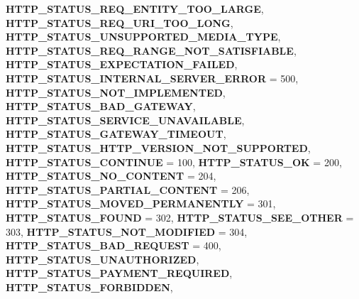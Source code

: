 \begin{DoxyCompactItemize}
{\bfseries H\+T\+T\+P\+\_\+\+S\+T\+A\+T\+U\+S\+\_\+\+R\+E\+Q\+\_\+\+E\+N\+T\+I\+T\+Y\+\_\+\+T\+O\+O\+\_\+\+L\+A\+R\+GE}, 
\newline
{\bfseries H\+T\+T\+P\+\_\+\+S\+T\+A\+T\+U\+S\+\_\+\+R\+E\+Q\+\_\+\+U\+R\+I\+\_\+\+T\+O\+O\+\_\+\+L\+O\+NG}, 
{\bfseries H\+T\+T\+P\+\_\+\+S\+T\+A\+T\+U\+S\+\_\+\+U\+N\+S\+U\+P\+P\+O\+R\+T\+E\+D\+\_\+\+M\+E\+D\+I\+A\+\_\+\+T\+Y\+PE}, 
{\bfseries H\+T\+T\+P\+\_\+\+S\+T\+A\+T\+U\+S\+\_\+\+R\+E\+Q\+\_\+\+R\+A\+N\+G\+E\+\_\+\+N\+O\+T\+\_\+\+S\+A\+T\+I\+S\+F\+I\+A\+B\+LE}, 
{\bfseries H\+T\+T\+P\+\_\+\+S\+T\+A\+T\+U\+S\+\_\+\+E\+X\+P\+E\+C\+T\+A\+T\+I\+O\+N\+\_\+\+F\+A\+I\+L\+ED}, 
\newline
{\bfseries H\+T\+T\+P\+\_\+\+S\+T\+A\+T\+U\+S\+\_\+\+I\+N\+T\+E\+R\+N\+A\+L\+\_\+\+S\+E\+R\+V\+E\+R\+\_\+\+E\+R\+R\+OR} = 500, 
{\bfseries H\+T\+T\+P\+\_\+\+S\+T\+A\+T\+U\+S\+\_\+\+N\+O\+T\+\_\+\+I\+M\+P\+L\+E\+M\+E\+N\+T\+ED}, 
{\bfseries H\+T\+T\+P\+\_\+\+S\+T\+A\+T\+U\+S\+\_\+\+B\+A\+D\+\_\+\+G\+A\+T\+E\+W\+AY}, 
{\bfseries H\+T\+T\+P\+\_\+\+S\+T\+A\+T\+U\+S\+\_\+\+S\+E\+R\+V\+I\+C\+E\+\_\+\+U\+N\+A\+V\+A\+I\+L\+A\+B\+LE}, 
\newline
{\bfseries H\+T\+T\+P\+\_\+\+S\+T\+A\+T\+U\+S\+\_\+\+G\+A\+T\+E\+W\+A\+Y\+\_\+\+T\+I\+M\+E\+O\+UT}, 
{\bfseries H\+T\+T\+P\+\_\+\+S\+T\+A\+T\+U\+S\+\_\+\+H\+T\+T\+P\+\_\+\+V\+E\+R\+S\+I\+O\+N\+\_\+\+N\+O\+T\+\_\+\+S\+U\+P\+P\+O\+R\+T\+ED}, 
{\bfseries H\+T\+T\+P\+\_\+\+S\+T\+A\+T\+U\+S\+\_\+\+C\+O\+N\+T\+I\+N\+UE} = 100, 
{\bfseries H\+T\+T\+P\+\_\+\+S\+T\+A\+T\+U\+S\+\_\+\+OK} = 200, 
\newline
{\bfseries H\+T\+T\+P\+\_\+\+S\+T\+A\+T\+U\+S\+\_\+\+N\+O\+\_\+\+C\+O\+N\+T\+E\+NT} = 204, 
{\bfseries H\+T\+T\+P\+\_\+\+S\+T\+A\+T\+U\+S\+\_\+\+P\+A\+R\+T\+I\+A\+L\+\_\+\+C\+O\+N\+T\+E\+NT} = 206, 
{\bfseries H\+T\+T\+P\+\_\+\+S\+T\+A\+T\+U\+S\+\_\+\+M\+O\+V\+E\+D\+\_\+\+P\+E\+R\+M\+A\+N\+E\+N\+T\+LY} = 301, 
{\bfseries H\+T\+T\+P\+\_\+\+S\+T\+A\+T\+U\+S\+\_\+\+F\+O\+U\+ND} = 302, 
\newline
{\bfseries H\+T\+T\+P\+\_\+\+S\+T\+A\+T\+U\+S\+\_\+\+S\+E\+E\+\_\+\+O\+T\+H\+ER} = 303, 
{\bfseries H\+T\+T\+P\+\_\+\+S\+T\+A\+T\+U\+S\+\_\+\+N\+O\+T\+\_\+\+M\+O\+D\+I\+F\+I\+ED} = 304, 
{\bfseries H\+T\+T\+P\+\_\+\+S\+T\+A\+T\+U\+S\+\_\+\+B\+A\+D\+\_\+\+R\+E\+Q\+U\+E\+ST} = 400, 
{\bfseries H\+T\+T\+P\+\_\+\+S\+T\+A\+T\+U\+S\+\_\+\+U\+N\+A\+U\+T\+H\+O\+R\+I\+Z\+ED}, 
\newline
{\bfseries H\+T\+T\+P\+\_\+\+S\+T\+A\+T\+U\+S\+\_\+\+P\+A\+Y\+M\+E\+N\+T\+\_\+\+R\+E\+Q\+U\+I\+R\+ED}, 
{\bfseries H\+T\+T\+P\+\_\+\+S\+T\+A\+T\+U\+S\+\_\+\+F\+O\+R\+B\+I\+D\+D\+EN}, 

\end{DoxyCompactItemize}
